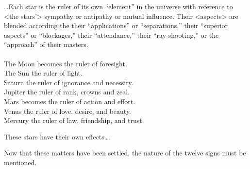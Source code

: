 \mnm[0.2cm]
\ldots Each star is the ruler of its own “element” in the universe with reference to <the stars’> sympathy or
antipathy or mutual influence. Their <aspects> are blended according the their “applications” or
“separations,” their “superior aspects” or “blockages,” their “attendance,” their “ray-shooting,” or the
“approach” of their masters. \\
\\
The Moon becomes the ruler of foresight. \\
The Sun the ruler of light. \\
Saturn the ruler of ignorance and necessity. \\
Jupiter the ruler of rank, crowns and zeal. \\
Mars becomes the ruler of action and effort. \\
Venus the ruler of love, desire, and beauty. \\
Mercury  the ruler of law, friendship, and trust. 

These stars have their own effects\ldots.

Now that these matters have been settled, the nature of the twelve signs must be mentioned.
\newpage